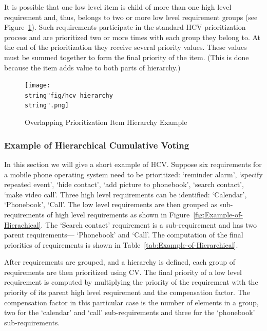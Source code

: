 It is possible that one low level item is child of more than one high
level requirement and, thus, belongs to two or more low level requirement
groups (see Figure~\ref{fig:Overlapping-Prioritization-Item}). Such
requirements participate in the standard HCV prioritization process and
are prioritized two or more times with each group they belong to.
At the end of the prioritization they receive several priority values.
These values must be summed together to form the final priority of the item.
(This is done because the item adds value to both parts of hierarchy.)


%
\begin{figure}
\texttt{[image: \\string"fig/hcv hierarchy\\string".png]}

\caption{\label{fig:Overlapping-Prioritization-Item}Overlapping Prioritization
Item Hierarchy Example}
%
\end{figure}



\subsubsection{Example of Hierarchical Cumulative Voting}

In this section we will give a short example of HCV. Suppose six requirements
for a mobile phone operating system need to be prioritized: `reminder
alarm', `specify repeated event', `hide contact', `add picture to phonebook',
`search contact', `make video call'. Three high level requirements can
be identified: `Calendar', `Phonebook', `Call'. The low level requirements are then
grouped as sub-requirements of high level requirements as shown in
Figure~\ref{fig:Example-of-Hierachical}. The `Search contact' requirement is a 
sub-requirement and has two parent requirements--- `Phonebook'
and `Call'. The computation of the final priorities of requirements is shown
in Table~\ref{tab:Example-of-Hierarchical}.

After requirements are grouped, and a hierarchy is defined, each group
of requirements are then prioritized using CV. The final priority of a low level
requirement is computed by multiplying the priority of the requirement
with the priority of its parent high level requirement and the compensation
factor. The compensation factor in this particular case is the number of elements
in a group, two for the `calendar' and `call' sub-requirements and three for
the `phonebook' sub-requirements.

